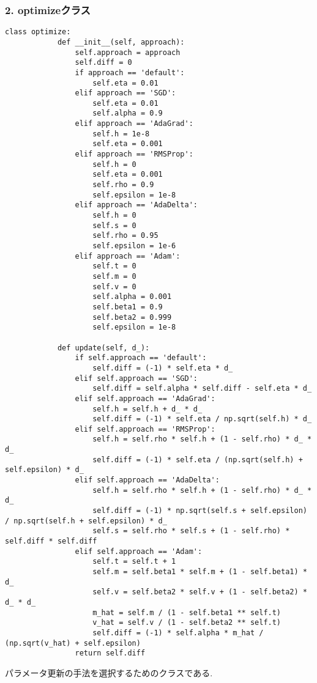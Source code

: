 \documentclass[a4j, titlepage]{jarticle}
\begin{document}
    \subsubsection*{2. optimizeクラス}
        \begin{lstlisting}[caption=パラメータ更新の手法選択,label=fuga]
        class optimize:
            def __init__(self, approach):
                self.approach = approach
                self.diff = 0
                if approach == 'default':
                    self.eta = 0.01
                elif approach == 'SGD':
                    self.eta = 0.01
                    self.alpha = 0.9
                elif approach == 'AdaGrad':
                    self.h = 1e-8
                    self.eta = 0.001
                elif approach == 'RMSProp':
                    self.h = 0
                    self.eta = 0.001
                    self.rho = 0.9
                    self.epsilon = 1e-8
                elif approach == 'AdaDelta':
                    self.h = 0
                    self.s = 0
                    self.rho = 0.95
                    self.epsilon = 1e-6
                elif approach == 'Adam':
                    self.t = 0
                    self.m = 0
                    self.v = 0
                    self.alpha = 0.001
                    self.beta1 = 0.9
                    self.beta2 = 0.999
                    self.epsilon = 1e-8

            def update(self, d_):
                if self.approach == 'default':
                    self.diff = (-1) * self.eta * d_
                elif self.approach == 'SGD':
                    self.diff = self.alpha * self.diff - self.eta * d_
                elif self.approach == 'AdaGrad':
                    self.h = self.h + d_ * d_
                    self.diff = (-1) * self.eta / np.sqrt(self.h) * d_
                elif self.approach == 'RMSProp':
                    self.h = self.rho * self.h + (1 - self.rho) * d_ * d_
                    self.diff = (-1) * self.eta / (np.sqrt(self.h) + self.epsilon) * d_
                elif self.approach == 'AdaDelta':
                    self.h = self.rho * self.h + (1 - self.rho) * d_ * d_
                    self.diff = (-1) * np.sqrt(self.s + self.epsilon) / np.sqrt(self.h + self.epsilon) * d_
                    self.s = self.rho * self.s + (1 - self.rho) * self.diff * self.diff
                elif self.approach == 'Adam':
                    self.t = self.t + 1
                    self.m = self.beta1 * self.m + (1 - self.beta1) * d_
                    self.v = self.beta2 * self.v + (1 - self.beta2) * d_ * d_
                    m_hat = self.m / (1 - self.beta1 ** self.t)
                    v_hat = self.v / (1 - self.beta2 ** self.t)
                    self.diff = (-1) * self.alpha * m_hat / (np.sqrt(v_hat) + self.epsilon)
                return self.diff
        \end{lstlisting}
        パラメータ更新の手法を選択するためのクラスである.
\end{document}
